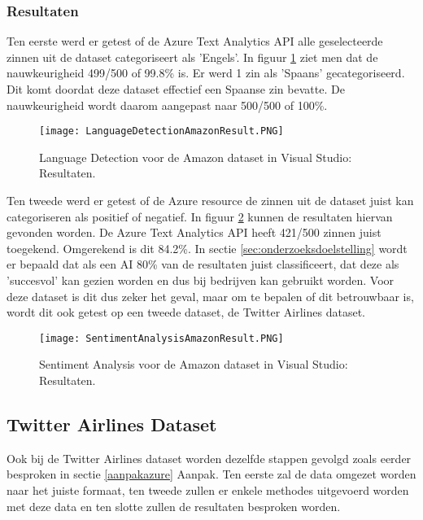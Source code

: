 \subsubsection{Resultaten}
\label{amazondatasetresultatenazure}
Ten eerste werd er getest of de Azure Text Analytics API alle geselecteerde zinnen uit de dataset categoriseert als 'Engels'. In figuur \ref{azurelanguagedetectionamazonresults} ziet men dat de nauwkeurigheid 499/500 of 99.8\% is. Er werd 1 zin als 'Spaans' gecategoriseerd. Dit komt doordat deze dataset effectief een Spaanse zin bevatte. De nauwkeurigheid wordt daarom aangepast naar 500/500 of 100\%.

\begin{figure}[!htbp]
    \texttt{[image: LanguageDetectionAmazonResult.PNG]}
    \caption{\label{azurelanguagedetectionamazonresults}Language Detection voor de Amazon dataset in Visual Studio: Resultaten.}
\end{figure}
\FloatBarrier 

Ten tweede werd er getest of de Azure resource de zinnen uit de dataset juist kan categoriseren als positief of negatief. In figuur \ref{azuresentimentanalysisamazonresults} kunnen de resultaten hiervan gevonden worden. De Azure Text Analytics API heeft 421/500 zinnen juist toegekend. Omgerekend is dit 84.2\%. In sectie \ref{sec:onderzoeksdoelstelling} wordt er bepaald dat als een AI 80\% van de resultaten juist classificeert, dat deze als 'succesvol' kan gezien worden en dus bij bedrijven kan gebruikt worden. Voor deze dataset is dit dus zeker het geval, maar om te bepalen of dit betrouwbaar is, wordt dit ook getest op een tweede dataset, de Twitter Airlines dataset. 

\begin{figure}[!htbp]
    \texttt{[image: SentimentAnalysisAmazonResult.PNG]}
    \caption{\label{azuresentimentanalysisamazonresults}Sentiment Analysis voor de Amazon dataset in Visual Studio: Resultaten.}
\end{figure}
\FloatBarrier 

\subsection{Twitter Airlines Dataset}
\label{twitterdatasetazure}

Ook bij de Twitter Airlines dataset worden dezelfde stappen gevolgd zoals eerder besproken in sectie \ref{aanpakazure} Aanpak. Ten eerste zal de data omgezet worden naar het juiste formaat, ten tweede zullen er enkele methodes uitgevoerd worden met deze data en ten slotte zullen de resultaten besproken worden. 

